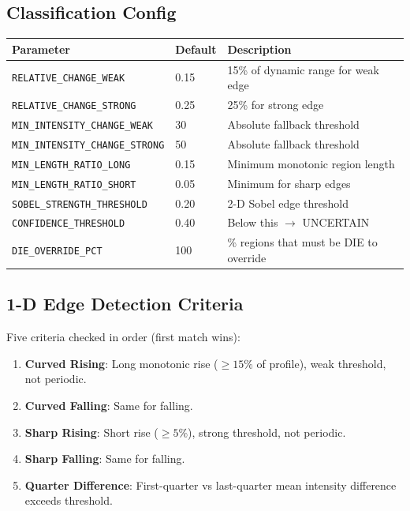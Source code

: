 \documentclass[11pt,a4paper]{article}
\begin{document}
\subsection{Classification Config}
\begin{longtable}{p{4.8cm}p{1.8cm}p{7cm}}\toprule
\textbf{Parameter} & \textbf{Default} & \textbf{Description}\\\midrule\endhead
\texttt{RELATIVE\_CHANGE\_WEAK} & 0.15 & 15\% of dynamic range for weak edge\\
\texttt{RELATIVE\_CHANGE\_STRONG} & 0.25 & 25\% for strong edge\\
\texttt{MIN\_INTENSITY\_CHANGE\_WEAK} & 30 & Absolute fallback threshold\\
\texttt{MIN\_INTENSITY\_CHANGE\_STRONG} & 50 & Absolute fallback threshold\\
\texttt{MIN\_LENGTH\_RATIO\_LONG} & 0.15 & Minimum monotonic region length\\
\texttt{MIN\_LENGTH\_RATIO\_SHORT} & 0.05 & Minimum for sharp edges\\
\texttt{SOBEL\_STRENGTH\_THRESHOLD} & 0.20 & 2-D Sobel edge threshold\\
\texttt{CONFIDENCE\_THRESHOLD} & 0.40 & Below this $\rightarrow$ UNCERTAIN\\
\texttt{DIE\_OVERRIDE\_PCT} & 100 & \% regions that must be DIE to override\\\bottomrule
\end{longtable}

\subsection{1-D Edge Detection Criteria}
Five criteria checked in order (first match wins):
\begin{enumerate}
\item \textbf{Curved Rising}: Long monotonic rise ($\geq 15\%$ of profile), weak threshold, not periodic.
\item \textbf{Curved Falling}: Same for falling.
\item \textbf{Sharp Rising}: Short rise ($\geq 5\%$), strong threshold, not periodic.
\item \textbf{Sharp Falling}: Same for falling.
\item \textbf{Quarter Difference}: First-quarter vs last-quarter mean intensity difference exceeds threshold.
\end{enumerate}

\end{document}
